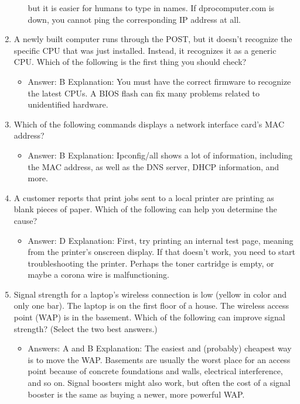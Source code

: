\documentclass{article}
\begin{document}
\begin{enumerate}
\begin{itemize}
but it is easier for humans to type in names. If dprocomputer.com is down, you cannot
ping the corresponding IP address at all.
    \end{itemize}
    \item A newly built computer runs through the POST, but it doesn’t recognize
the specific CPU that was just installed. Instead, it recognizes
it as a generic CPU. Which of the following is the first thing
you should check?
    \begin{itemize}
        \item Answer: B
Explanation: You must have the correct firmware to recognize the latest CPUs. A BIOS
flash can fix many problems related to unidentified hardware.
    \end{itemize}
    \item Which of the following commands displays a network interface
card’s MAC address?
    \begin{itemize}
        \item Answer: B
Explanation: Ipconfig/all shows a lot of information, including the MAC address, as
well as the DNS server, DHCP information, and more.
    \end{itemize}
    \item A customer reports that print jobs sent to a local printer are printing
as blank pieces of paper. Which of the following can help you
determine the cause?
    \begin{itemize}
        \item Answer: D
Explanation: First, try printing an internal test page, meaning from the printer’s
onscreen display. If that doesn’t work, you need to start troubleshooting the printer.
Perhaps the toner cartridge is empty, or maybe a corona wire is malfunctioning.
    \end{itemize}
    \item Signal strength for a laptop’s wireless connection is low (yellow in
color and only one bar). The laptop is on the first floor of a house.
The wireless access point (WAP) is in the basement. Which of
the following can improve signal strength? (Select the two best
answers.)
    \begin{itemize}
        \item Answers: A and B
Explanation: The easiest and (probably) cheapest way is to move the WAP. Basements
are usually the worst place for an access point because of concrete foundations and
walls, electrical interference, and so on. Signal boosters might also work, but often the
cost of a signal booster is the same as buying a newer, more powerful WAP.

\end{itemize}
\end{enumerate}
\end{document}
